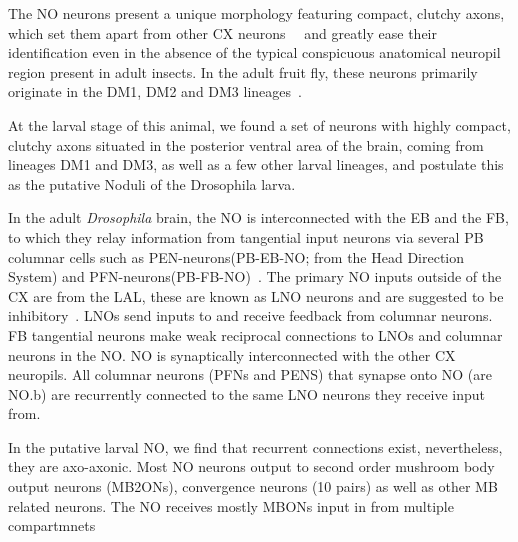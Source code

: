 \documentclass{article}
\begin{document}
The NO neurons present a unique morphology featuring compact, clutchy axons, which set them apart from other CX neurons~\citep{wolff2018neuroarchitecture}~\citep{hulse2021connectome} and greatly ease their identification even in the absence of the typical conspicuous anatomical neuropil region present in adult insects. In the adult fruit fly, these neurons primarily originate in the DM1, DM2 and DM3 lineages~\citep{andrade2019developmentally}.


At the larval stage of this animal, we found a set of neurons with highly compact, clutchy axons situated in the posterior ventral area of the brain, coming from lineages DM1 and DM3, as well as a few other larval lineages, and postulate this as the putative Noduli of the Drosophila larva. 

In the adult \textit{Drosophila} brain, the NO is  interconnected with the EB and the FB, to which they relay information from tangential input neurons via several PB columnar cells such as PEN-neurons(PB-EB-NO; from the Head Direction System) and PFN-neurons(PB-FB-NO)~\citep{wolff2015neuroarchitecture, hulse2021connectome}. The primary NO inputs outside of the CX are from the LAL, these are known as LNO neurons and are suggested to be inhibitory~\citep{wolff2018neuroarchitecture,hulse2021connectome}. LNOs send inputs to and receive feedback from columnar neurons. %
FB tangential neurons make weak reciprocal connections to LNOs and columnar neurons in the NO.
NO is synaptically interconnected with the other CX neuropils. All columnar neurons (PFNs and PENS) that synapse onto NO (are NO.b) are recurrently connected to the same LNO neurons they receive input from. 


In the putative larval NO, we find that recurrent connections exist, nevertheless, they are axo-axonic.
Most NO neurons output to second order mushroom body output neurons (MB2ONs), convergence neurons (10 pairs) as well as other MB related neurons. 
The NO receives mostly MBONs input in from multiple compartmnets 

\end{document}
